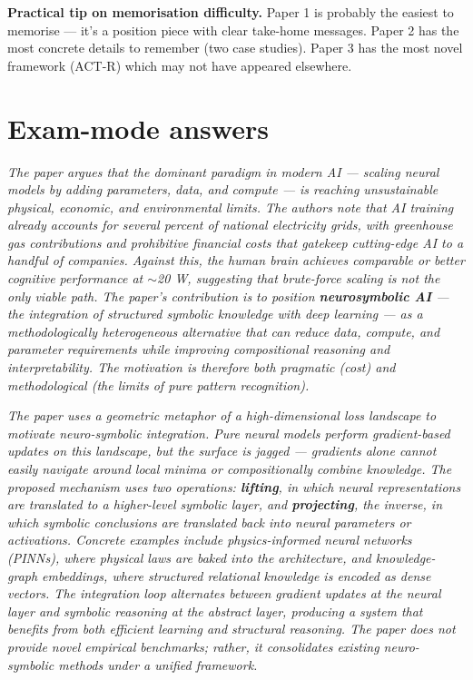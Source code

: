 \documentclass[11pt, a4paper]{article}
\begin{document}
\textbf{Practical tip on memorisation difficulty.} Paper 1 is probably the easiest to memorise — it's a position piece with clear take-home messages. Paper 2 has the most concrete details to remember (two case studies). Paper 3 has the most novel framework (ACT-R) which may not have appeared elsewhere.

\section{Exam-mode answers}

\begin{exambox}
\textit{The paper argues that the dominant paradigm in modern AI — scaling neural models by adding parameters, data, and compute — is reaching unsustainable physical, economic, and environmental limits. The authors note that AI training already accounts for several percent of national electricity grids, with greenhouse gas contributions and prohibitive financial costs that gatekeep cutting-edge AI to a handful of companies. Against this, the human brain achieves comparable or better cognitive performance at $\sim$20 W, suggesting that brute-force scaling is not the only viable path. The paper's contribution is to position \textbf{neurosymbolic AI} — the integration of structured symbolic knowledge with deep learning — as a methodologically heterogeneous alternative that can reduce data, compute, and parameter requirements while improving compositional reasoning and interpretability. The motivation is therefore both pragmatic (cost) and methodological (the limits of pure pattern recognition).}
\end{exambox}

\begin{exambox}
\textit{The paper uses a geometric metaphor of a high-dimensional loss landscape to motivate neuro-symbolic integration. Pure neural models perform gradient-based updates on this landscape, but the surface is jagged — gradients alone cannot easily navigate around local minima or compositionally combine knowledge. The proposed mechanism uses two operations: \textbf{lifting}, in which neural representations are translated to a higher-level symbolic layer, and \textbf{projecting}, the inverse, in which symbolic conclusions are translated back into neural parameters or activations. Concrete examples include physics-informed neural networks (PINNs), where physical laws are baked into the architecture, and knowledge-graph embeddings, where structured relational knowledge is encoded as dense vectors. The integration loop alternates between gradient updates at the neural layer and symbolic reasoning at the abstract layer, producing a system that benefits from both efficient learning and structural reasoning. The paper does not provide novel empirical benchmarks; rather, it consolidates existing neuro-symbolic methods under a unified framework.}
\end{exambox}
\end{document}
